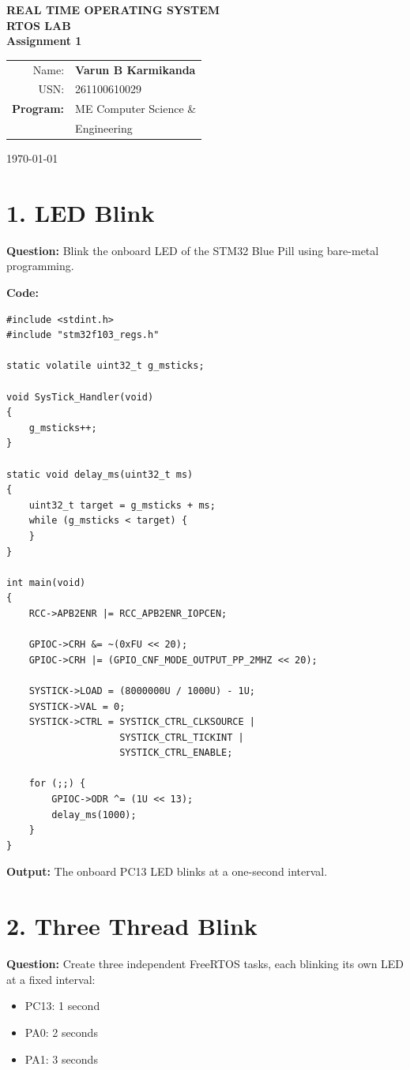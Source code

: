 \documentclass[12pt,a4paper]{article}
\begin{document}
\begin{titlepage}
    \centering
    \vspace*{2cm}
    {\Large\textbf{REAL TIME OPERATING SYSTEM}}\\[0.7cm]
    {\Large\textbf{RTOS LAB}}\\[1.2cm]
    {\Huge\textbf{Assignment 1}}\\[2cm]
    \begin{tabular}{r p{7.5cm}}
    \Large{Name:}     & {\Large\textbf{Varun B Karmikanda}} \\[0.4cm]
    \Large{USN:}      & {\Large{261100610029}} \\[0.4cm]
    \textbf{Program:} & ME Computer Science \& \\[0.1cm]
                      & Engineering
\end{tabular}
    \vfill
    {\large \today}
\end{titlepage}

\section*{1. LED Blink}
\textbf{Question:} Blink the onboard LED of the STM32 Blue Pill using
bare-metal programming.

\textbf{Code:}
\begin{lstlisting}
#include <stdint.h>
#include "stm32f103_regs.h"

static volatile uint32_t g_msticks;

void SysTick_Handler(void)
{
    g_msticks++;
}

static void delay_ms(uint32_t ms)
{
    uint32_t target = g_msticks + ms;
    while (g_msticks < target) {
    }
}

int main(void)
{
    RCC->APB2ENR |= RCC_APB2ENR_IOPCEN;

    GPIOC->CRH &= ~(0xFU << 20);
    GPIOC->CRH |= (GPIO_CNF_MODE_OUTPUT_PP_2MHZ << 20);

    SYSTICK->LOAD = (8000000U / 1000U) - 1U;
    SYSTICK->VAL = 0;
    SYSTICK->CTRL = SYSTICK_CTRL_CLKSOURCE |
                    SYSTICK_CTRL_TICKINT |
                    SYSTICK_CTRL_ENABLE;

    for (;;) {
        GPIOC->ODR ^= (1U << 13);
        delay_ms(1000);
    }
}
\end{lstlisting}

\textbf{Output:} The onboard PC13 LED blinks at a one-second interval.

\newpage
\section*{2. Three Thread Blink}
\textbf{Question:} Create three independent FreeRTOS tasks, each blinking
its own LED at a fixed interval:
\begin{itemize}[noitemsep]
    \item PC13: 1 second
    \item PA0: 2 seconds
    \item PA1: 3 seconds
\end{itemize}
\end{document}
